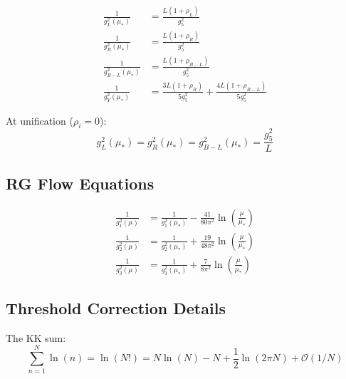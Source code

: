 \documentclass[11pt,a4paper]{article}
\theoremstyle{definition}
\begin{document}
\begin{align}
\label{eq:gL_stack}
\frac{1}{g_L^2(\mu_*)} &= \frac{L(1 + \rho_L)}{g_5^2} \\
\label{eq:gR_stack}
\frac{1}{g_R^2(\mu_*)} &= \frac{L(1 + \rho_R)}{g_5^2} \\
\label{eq:gBL_stack}
\frac{1}{g_{B-L}^2(\mu_*)} &= \frac{L(1 + \rho_{B-L})}{g_5^2} \\
\label{eq:gY_stack}
\frac{1}{g_Y^2(\mu_*)} &= \frac{3L(1 + \rho_R)}{5g_5^2} + \frac{4L(1 + \rho_{B-L})}{5g_5^2}
\end{align}

At unification ($\rho_i = 0$):
\begin{equation}
\label{eq:unified_coupling}
g_L^2(\mu_*) = g_R^2(\mu_*) = g_{B-L}^2(\mu_*) = \frac{g_5^2}{L}
\end{equation}

\subsection{RG Flow Equations}
\label{subsec:rg_flow}

\begin{align}
\label{eq:rg_g1}
\frac{1}{g_1^2(\mu)} &= \frac{1}{g_1^2(\mu_*)} - \frac{41}{80\pi^2}\ln\left(\frac{\mu}{\mu_*}\right) \\
\label{eq:rg_g2}
\frac{1}{g_2^2(\mu)} &= \frac{1}{g_2^2(\mu_*)} + \frac{19}{48\pi^2}\ln\left(\frac{\mu}{\mu_*}\right) \\
\label{eq:rg_g3}
\frac{1}{g_3^2(\mu)} &= \frac{1}{g_3^2(\mu_*)} + \frac{7}{8\pi^2}\ln\left(\frac{\mu}{\mu_*}\right)
\end{align}

\subsection{Threshold Correction Details}
\label{subsec:threshold_details}

The KK sum:
\begin{equation}
\label{eq:kk_sum_detailed}
\sum_{n=1}^{N}\ln(n) = \ln(N!) = N\ln(N) - N + \frac{1}{2}\ln(2\pi N) + \mathcal{O}(1/N)
\end{equation}
\end{document}
